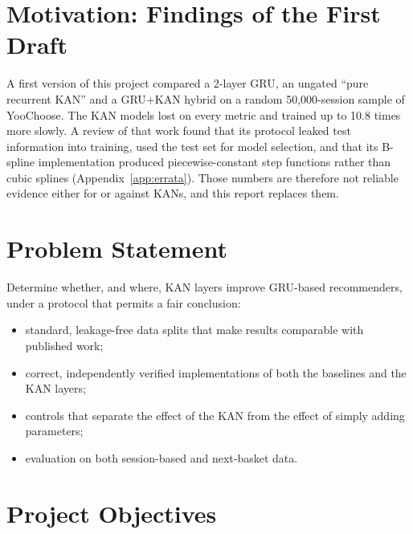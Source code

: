 \section{Motivation: Findings of the First Draft}

A first version of this project compared a 2-layer GRU, an ungated ``pure
recurrent KAN'' and a GRU+KAN hybrid on a random 50,000-session sample of
YooChoose. The KAN models lost on every metric and trained up to 10.8 times more
slowly. A review of that work found that its protocol leaked test information
into training, used the test set for model selection, and that its B-spline
implementation produced piecewise-constant step functions rather than cubic
splines (Appendix~\ref{app:errata}). Those numbers are therefore not reliable
evidence either for or against KANs, and this report replaces them.

\section{Problem Statement}

Determine whether, and where, KAN layers improve GRU-based recommenders, under
a protocol that permits a fair conclusion:

\begin{itemize}
    \item standard, leakage-free data splits that make results comparable with
          published work;
    \item correct, independently verified implementations of both the baselines
          and the KAN layers;
    \item controls that separate the effect of the KAN from the effect of simply
          adding parameters;
    \item evaluation on both session-based and next-basket data.
\end{itemize}

\section{Project Objectives}

